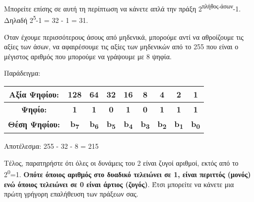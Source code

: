 Μπορείτε επίσης σε αυτή τη περίπτωση να κάνετε απλά την πράξη 2\textsuperscript{πλήθος-άσων}-1. Δηλαδή 2\textsuperscript{5}-1 = 32 - 1 = 31.

Όταν έχουμε περισσότερους άσους από μηδενικά, μπορούμε αντί να αθροίζουμε τις αξίες των άσων, να αφαιρέσουμε τις αξίες των μηδενικών από το 255 που είναι ο μέγιστος αριθμός που μπορούμε να γράψουμε με 8 ψηφία.

Παράδειγμα:

\begin{center}
\begin{tabular}{|c|c|c|c|c|c|c|c|c|}
\hline
Αξία Ψηφίου: & 128 & 64 & 32 & 16 & 8 & 4 & 2 & 1 \\
\hline
\textbf{Ψηφίο:} & \textbf{1} & \textbf{1} & \textbf{0} & \textbf{1} & \textbf{0} & \textbf{1} & \textbf{1} & \textbf{1} \\
\hline
\textbf{Θέση Ψηφίου:} & \textbf{b\textsubscript{7}}& \textbf{b\textsubscript{6}} & \textbf{b\textsubscript{5}} & \textbf{b\textsubscript{4}} & \textbf{b\textsubscript{3}}& \textbf{b\textsubscript{2}} & \textbf{b\textsubscript{1}} & \textbf{b\textsubscript{0}}  \\
\hline
\end{tabular}

Αποτέλεσμα: 255 - 32 - 8 = 215 
\end{center}

Τέλος, παρατηρήστε ότι όλες οι δυνάμεις του 2 είναι ζυγοί αριθμοί, εκτός από το 2\textsuperscript{0}=1. \textbf{Οπότε όποιος αριθμός στο δυαδικό τελειώνει σε 1, είναι περιττός (μονός) ενώ όποιος τελειώνει σε 0 είναι άρτιος (ζυγός)}. Έτσι μπορείτε να κάνετε μια πρώτη γρήγορη επαλήθευση των πράξεων σας.